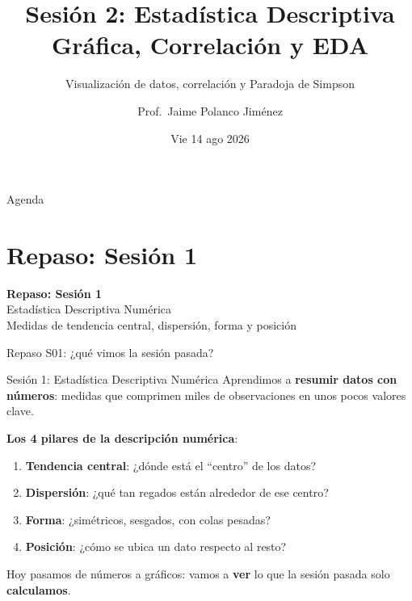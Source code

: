 \documentclass[aspectratio=169, 11pt]{beamer}
\title{Sesión 2: Estadística Descriptiva Gráfica, Correlación y EDA}
\subtitle{Visualización de datos, correlación y Paradoja de Simpson}
\author{Prof.\ Jaime Polanco Jim\'enez}
\date{Vie 14 ago 2026}
\begin{document}
\begin{frame}
\titlepage
\end{frame}

\begin{frame}{Agenda}
\tableofcontents
\end{frame}

\section{Repaso: Sesi\'on 1}

\begin{frame}{}
\vfill
\centering
{\Large\textbf{Repaso: Sesi\'on 1}}\\[1em]
{\normalsize Estad\'istica Descriptiva Num\'erica}\\[0.5em]
{\small Medidas de tendencia central, dispersi\'on, forma y posici\'on}
\vfill
\end{frame}

\begin{frame}{Repaso S01: ¿qué vimos la sesión pasada?}
\begin{block}{Sesión 1: Estadística Descriptiva Numérica}
Aprendimos a \textbf{resumir datos con n\'umeros}: medidas que comprimen miles de observaciones en unos pocos valores clave.
\end{block}

\textbf{Los 4 pilares de la descripci\'on num\'erica}:

\begin{enumerate}
\item \textbf{Tendencia central}: ¿d\'onde est\'a el ``centro'' de los datos?
\item \textbf{Dispersi\'on}: ¿qu\'e tan regados est\'an alrededor de ese centro?
\item \textbf{Forma}: ¿sim\'etricos, sesgados, con colas pesadas?
\item \textbf{Posici\'on}: ¿c\'omo se ubica un dato respecto al resto?
\end{enumerate}

\vspace{0.3em}
\alert{Hoy pasamos de n\'umeros a gr\'aficos: vamos a \textbf{ver} lo que la sesi\'on pasada solo \textbf{calculamos}.}
\end{frame}
\end{document}
